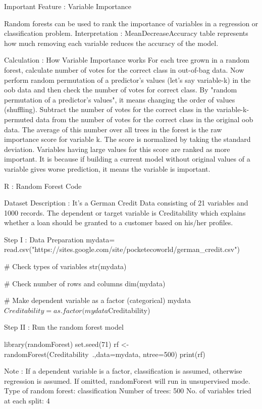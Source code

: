 Important Feature : Variable Importance

Random forests can be used to rank the importance of variables in a regression or classification problem. 
Interpretation : MeanDecreaseAccuracy table represents how much removing each variable reduces the accuracy of the model.

Calculation : How Variable Importance works
For each tree grown in a random forest, calculate number of votes for the correct class in out-of-bag data.
Now perform random permutation of  a predictor's values (let's say variable-k) in the oob data and then check the number of votes for correct class. By "random permutation of a predictor's values", it means changing the order of values (shuffling).
Subtract the number of votes for the correct class in the variable-k-permuted data from the number of votes for the correct class in the original oob data. 
The average of this number over all trees in the forest is the raw importance score for variable k. The score is normalized by taking the standard deviation.
Variables having large values for this score are ranked as more important. It is because if building a current model without original values of a variable gives worse prediction, it means the variable is important.

R : Random Forest Code

Dataset Description : It's a German Credit Data consisting of 21 variables and 1000 records. The dependent or target variable is Creditability which explains whether a loan should be granted to a customer based on his/her profiles.

Step I : Data Preparation
mydata= read.csv("https://sites.google.com/site/pocketecoworld/german_credit.csv")

# Check types of variables
str(mydata)

# Check number of rows and columns
dim(mydata)

# Make dependent variable as a factor (categorical)
mydata$Creditability = as.factor(mydata$Creditability)

Step II : Run the random forest model

library(randomForest)
set.seed(71) 
rf <-randomForest(Creditability~.,data=mydata, ntree=500) 
print(rf)

Note : If a dependent variable is a factor, classification is assumed, otherwise regression is assumed. If omitted, randomForest will run in unsupervised mode.
               Type of random forest: classification
                     Number of trees: 500
No. of variables tried at each split: 4

